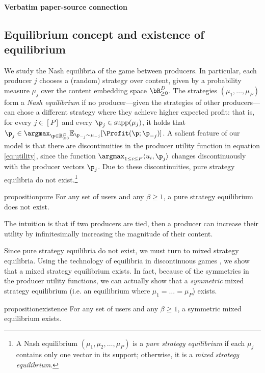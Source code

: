 \documentclass[10pt]{article}
\begin{document}
\paragraph{Verbatim paper-source connection}
\begin{ReviewVerbatim}
\subsection{Equilibrium concept and existence of equilibrium}
\label{sec:equilibrium-def}


We study the Nash equilibria of the game between producers. In particular, each producer $j$ chooses a (random) strategy over content, given by a probability measure $\mu_j$ over the content embedding space $\bR_{\geq 0}^D$. The strategies $(\mu_1, \ldots, \mu_P)$ form a \textit{Nash equilibrium} if no producer---given the strategies of other producers---can chose a different strategy where they achieve higher expected profit: that is, for every $j \in [P]$ and every $\p_j \in \text{supp}(\mu_j)$, it holds that $\p_j \in \argmax_{\p \in \mathbb{R}_{\ge 0}^D} \mathbb{E}_{\p_{-j} \sim \mu_{-j}}[\Profit(\p; \p_{-j})]$. A salient feature of our model is that there are  discontinuities in the producer utility function in equation \eqref{eq:utility}, since the function $\argmax_{1 \le i \le P} \langle u_i, \p_j \rangle$ changes discontinuously with the producer vectors $\p_j$. Due to these discontinuities, pure strategy equilibria do not exist.\footnote{A Nash equilibrium $(\mu_{1}, \mu_2, \ldots, \mu_P)$ is a \textit{pure strategy equilibrium} if each $\mu_j$ contains only one vector in its support; otherwise, it is a \textit{mixed strategy equilibrium}.}
\begin{restatable}{proposition}{pure}
\label{prop:pure}
For any set of users and any $\beta \ge 1$, a pure strategy equilibrium does not exist.
\end{restatable}
\noindent The intuition is that if two producers are tied, then a producer can increase their utility by infinitesimally increasing the magnitude of their content.


Since pure strategy equilibria do not exist, we must turn to mixed strategy equilibria. Using the technology of equilibria in discontinuous games \citep{reny99}, we show that a mixed strategy equilibrium exists. In fact, because of the symmetries in the producer utility functions, we can actually show that a
\textit{symmetric} mixed strategy equilibrium  (i.e. an equilibrium where $\mu_1 = \ldots = \mu_P$) exists.
\begin{restatable}{proposition}{existence}
\label{prop:existence}
For any set of users and any $\beta \ge 1$, a symmetric mixed equilibrium exists.
\end{restatable}


\end{ReviewVerbatim}
\end{document}
